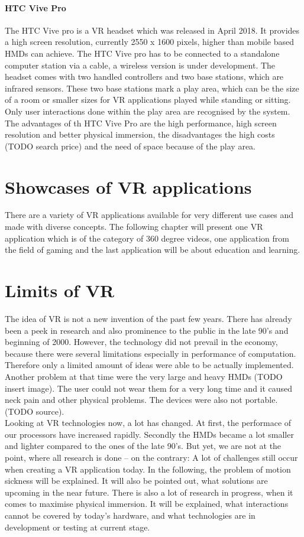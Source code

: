 \paragraph{HTC Vive Pro}
The HTC Vive pro is a VR headset which was released in April 2018. It provides a high screen resolution, currently 2550 x 1600 pixels, higher than mobile based HMDs can achieve. The HTC Vive pro has to be connected to a standalone computer station via a cable, a wireless version is under development. The headset comes with two handled controllers and two base stations, which are infrared sensors. 
These two base stations mark a play area, which can be the size of a room or smaller sizes for VR applications played while standing or sitting. Only user interactions done within the play area are recognised by the system. \cite{Ogdon.2019}
The advantages of th HTC Vive Pro are the high performance, high screen resolution and better physical immersion, the disadvantages the high costs (TODO search price) and the need of space because of the play area.

\section{Showcases of VR applications}
There are a variety of VR applications available for very different use cases and made with diverse concepts. The following chapter will present one VR application which is of the category of 360 degree videos, one application from the field of gaming and the last application will be about education and learning.
\section{Limits of VR}
The idea of VR is not a new invention of the past few years. There has already been a peek in research and also prominence to the public in the late 90's and beginning of 2000. However, the technology did not prevail in the economy, because there were several limitations especially in performance of computation. Therefore only a limited amount of ideas were able to be actually implemented. Another problem at that time were the very large and heavy HMDs (TODO insert image). The user could not wear them for a very long time and it caused neck pain and other physical problems. The devices were also not portable.(TODO source).\\
Looking at VR technologies now, a lot has changed. At first, the performace of our processors have increased rapidly. Secondly the HMDs became a lot smaller and lighter compared to the ones of the late 90's. But yet, we are not at the point, where all research is done -- on the contrary: A lot of challenges still occur when creating a VR application today. In the following, the problem of motion sickness will be explained. It will also be pointed out, what solutions are upcoming in the near future. There is also a lot of research in progress, when it comes to maximise physical immersion. It will be explained, what interactions cannot be covered by today's hardware, and what technologies are in development or testing at current stage.

